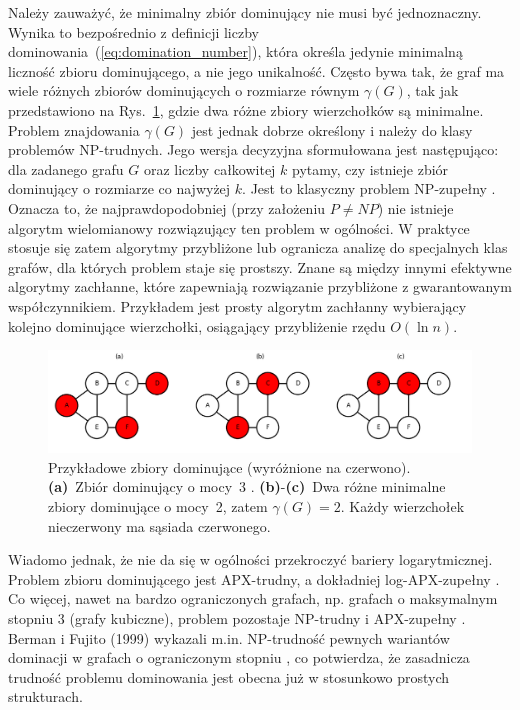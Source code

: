 Należy zauważyć, że minimalny zbiór dominujący nie musi być jednoznaczny.
Wynika to bezpośrednio z definicji liczby dominowania~(\ref{eq:domination_number}),
która określa jedynie minimalną liczność zbioru dominującego, a nie jego unikalność.
Często bywa tak, że graf ma wiele różnych zbiorów dominujących o rozmiarze równym $\gamma(G)$,
tak jak przedstawiono na Rys.~\ref{fig:dominatingexample}, gdzie dwa różne zbiory wierzchołków są minimalne.
Problem znajdowania $\gamma(G)$ jest jednak dobrze określony i należy do klasy problemów NP-trudnych. Jego wersja decyzyjna sformułowana jest następująco: dla zadanego grafu $G$ oraz liczby całkowitej $k$ pytamy, czy istnieje zbiór dominujący o rozmiarze co najwyżej $k$. Jest to klasyczny problem NP-zupełny \cite{wikiDominatingSet, POUREIDI2023106363, PANDA2023337}. Oznacza to, że najprawdopodobniej (przy założeniu $P \neq NP$) nie istnieje algorytm wielomianowy rozwiązujący ten problem w ogólności. W praktyce stosuje się zatem algorytmy przybliżone lub ogranicza analizę do specjalnych klas grafów, dla których problem staje się prostszy. Znane są między innymi efektywne algorytmy zachłanne, które zapewniają rozwiązanie przybliżone z gwarantowanym współczynnikiem. Przykładem jest prosty algorytm zachłanny wybierający kolejno dominujące wierzchołki, osiągający przybliżenie rzędu $O(\ln n)$.


\begin{figure}[H]
  \centering
  \includegraphics[width=1\textwidth]{assets/dominating-set-example.png}
  \caption[Przykładowe zbiory dominujące]{%
    Przykładowe zbiory dominujące (wyróżnione na czerwono).
    \textbf{(a)}~Zbiór dominujący o mocy~3 .
    \textbf{(b)}-\textbf{(c)}~Dwa różne minimalne zbiory dominujące o mocy~2, zatem
    \(\gamma(G)=2\).  Każdy wierzchołek nieczerwony ma sąsiada czerwonego.
  }
  \label{fig:dominatingexample}
\end{figure}

Wiadomo jednak, że nie da się w ogólności przekroczyć bariery logarytmicznej. Problem zbioru dominującego jest APX-trudny, a dokładniej log-APX-zupełny \cite{POUREIDI2023106363}. Co więcej, nawet na bardzo ograniczonych grafach, np. grafach o maksymalnym stopniu 3 (grafy kubiczne), problem pozostaje NP-trudny i APX-zupełny \cite{ALIMONTI2000123}. Berman i Fujito (1999) wykazali m.in. NP-trudność pewnych wariantów dominacji w grafach o ograniczonym stopniu \cite{BermanFujitoThreeDegree}, co potwierdza, że zasadnicza trudność problemu dominowania jest obecna już w stosunkowo prostych strukturach.


